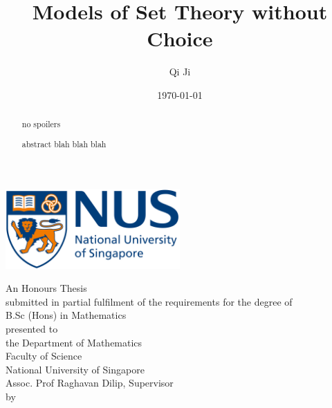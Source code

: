 \documentclass[british,a4paper,12pt,abstract=on]{scrreprt}
\title{Models of Set Theory without Choice}
\author{Qi Ji}
\date{\today}
\makeatletter
\let\thetitle\@title
\let\theauthor\@author
\let\thedate\@date
\theoremstyle{definition}
\theoremstyle{remark}
\newcommand{\makecoverpage}{
    \begin{center}
        \singlespacing
        \includegraphics[width=0.5\textwidth]{nus_logo}
        \vspace*{3em}

        \doublespacing
        {\huge \textbf{\thetitle}}
        \vspace*{5em}

        {An Honours Thesis \\ submitted in partial fulfilment of the requirements for
        the degree of \\ B.Sc (Hons) in Mathematics\\}
        \vspace*{3em}
        {presented to \\ the Department of Mathematics \\ Faculty of Science \\ National University of Singapore \\ Assoc. Prof Raghavan Dilip, Supervisor \\}
        \vspace*{3em}
        {by \\ \theauthor \\}
        \vspace*{3em}
        {\thedate}
    \end{center}
}
\newenvironment*{acknowledgements}{\renewcommand\abstractname{Acknowledgements}\begin{abstract}} {\end{abstract}}
\makeatother
\begin{document}
\let\setminus\smallsetminus
\let\epsilon\varepsilon
\begin{titlepage}
    \makecoverpage
\end{titlepage}
{}
\begin{acknowledgements}
    no spoilers

\end{acknowledgements}

{}
\begin{abstract}
    abstract blah blah blah


\end{abstract}

\tableofcontents







\printbibliography[heading=bibintoc,title={References}]
\end{document}

